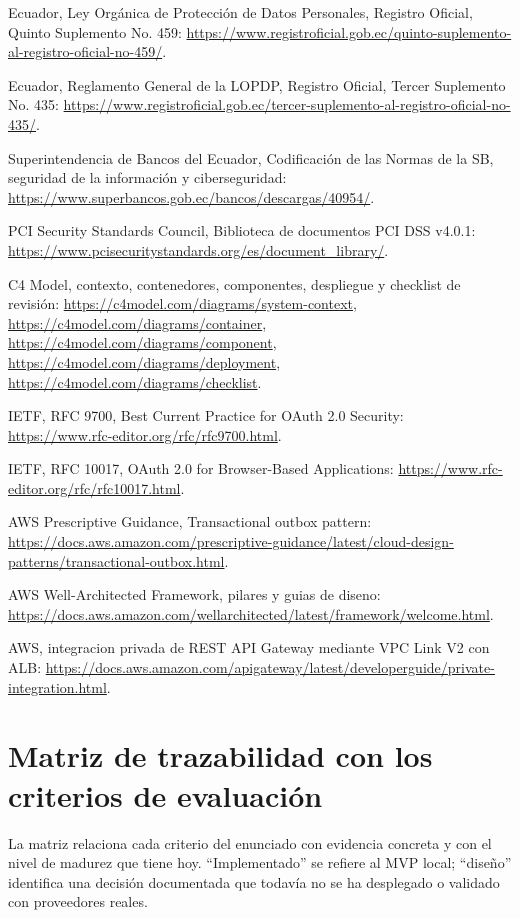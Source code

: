\documentclass[11pt,a4paper]{report}
\begin{document}
\begin{enumerate}[label={[\arabic*]}]
\item Ecuador, Ley Org\'anica de Protecci\'on de Datos Personales, Registro Oficial, Quinto Suplemento No. 459: \url{https://www.registroficial.gob.ec/quinto-suplemento-al-registro-oficial-no-459/}.
\item Ecuador, Reglamento General de la LOPDP, Registro Oficial, Tercer Suplemento No. 435: \url{https://www.registroficial.gob.ec/tercer-suplemento-al-registro-oficial-no-435/}.
\item Superintendencia de Bancos del Ecuador, Codificaci\'on de las Normas de la SB, seguridad de la informaci\'on y ciberseguridad: \url{https://www.superbancos.gob.ec/bancos/descargas/40954/}.
\item PCI Security Standards Council, Biblioteca de documentos PCI DSS v4.0.1: \url{https://www.pcisecuritystandards.org/es/document_library/}.
\item C4 Model, contexto, contenedores, componentes, despliegue y checklist de revisión: \url{https://c4model.com/diagrams/system-context}, \url{https://c4model.com/diagrams/container}, \url{https://c4model.com/diagrams/component}, \url{https://c4model.com/diagrams/deployment}, \url{https://c4model.com/diagrams/checklist}.
\item IETF, RFC 9700, Best Current Practice for OAuth 2.0 Security: \url{https://www.rfc-editor.org/rfc/rfc9700.html}.
\item IETF, RFC 10017, OAuth 2.0 for Browser-Based Applications: \url{https://www.rfc-editor.org/rfc/rfc10017.html}.
\item AWS Prescriptive Guidance, Transactional outbox pattern: \url{https://docs.aws.amazon.com/prescriptive-guidance/latest/cloud-design-patterns/transactional-outbox.html}.
\item AWS Well-Architected Framework, pilares y guias de diseno: \url{https://docs.aws.amazon.com/wellarchitected/latest/framework/welcome.html}.
\item AWS, integracion privada de REST API Gateway mediante VPC Link V2 con ALB: \url{https://docs.aws.amazon.com/apigateway/latest/developerguide/private-integration.html}.
\end{enumerate}

\appendix
\chapter{Matriz de trazabilidad con los criterios de evaluaci\'on}
\label{chap:trazabilidad}
La matriz relaciona cada criterio del enunciado con evidencia concreta y con el nivel de madurez que tiene hoy. ``Implementado'' se refiere al MVP local; ``dise\~no'' identifica una decisi\'on documentada que todav\'ia no se ha desplegado o validado con proveedores reales.
\end{document}
